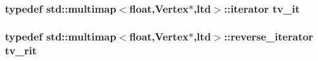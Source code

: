 \subsubsection{\setlength{\rightskip}{0pt plus 5cm}typedef std::multimap$<$float,{\bf Vertex}$\ast$,{\bf ltd}$>$::iterator {\bf tv\_\-it}}\label{virtual__disp_8h_ce8a1cf2849bb6d7740f46bc858a2a53}


\subsubsection{\setlength{\rightskip}{0pt plus 5cm}typedef std::multimap$<$float,{\bf Vertex}$\ast$,{\bf ltd}$>$::reverse\_\-iterator {\bf tv\_\-rit}}\label{virtual__disp_8h_caa21ff3e334d48bc50c72b86b299b42}


